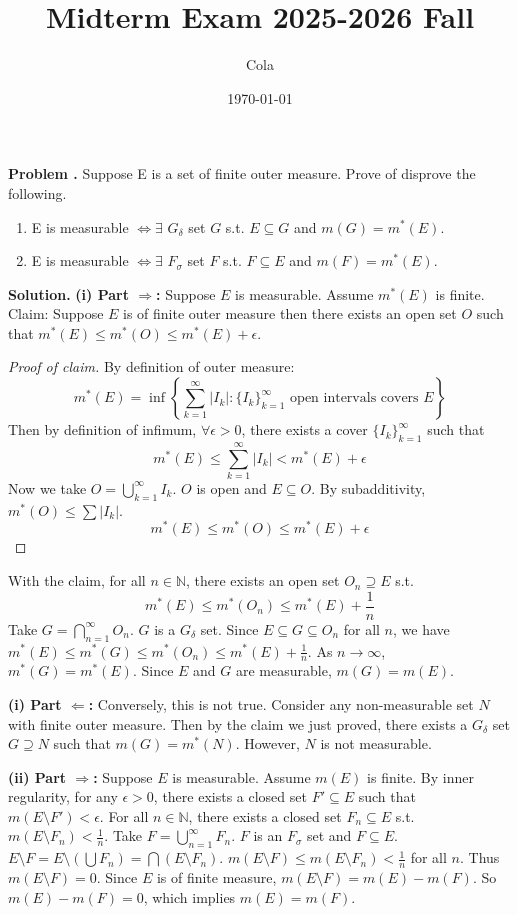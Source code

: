\documentclass[12pt, a4paper, oneside]{article}
\title{\textbf{Midterm Exam 2025-2026 Fall}}
\author{Cola}
\date{\today}
\newcounter{problemname}
\newenvironment{problem}
  {\begin{shaded}\stepcounter{problemname}\par\noindent\textbf{Problem \arabic{problemname}.
}\newline}
  {\end{shaded}\par}
\newenvironment{solution}
  {\par\noindent\textbf{Solution. }\newline}
  {\par}
\begin{document}
\maketitle


\begin{problem}
Suppose E is a set of finite outer measure. Prove of disprove the following.
\begin{enumerate}
    \item E is measurable $\iff \exists$ $G_{\delta}$ set $G$ s.t.
$E \subseteq G$ and $m(G) = m^*(E)$. 
    \item E is measurable $\iff \exists$ $F_{\sigma}$ set $F$ s.t. $F \subseteq E$ and $m(F) = m^*(E)$.
\end{enumerate}
\end{problem}

\begin{solution}
\textbf{(i) Part $\Rightarrow$:}
Suppose $E$ is measurable.
Assume $m^*(E)$ is finite.
Claim: Suppose $E$ is of finite outer measure then there exists an open set $O$ such that $m^*(E) \le m^*(O) \le m^*(E) + \epsilon$.
\begin{proof}[Proof of claim]
By definition of outer measure:
$$ m^*(E) = \inf \left\{ \sum_{k=1}^\infty |I_k| : \{I_k\}_{k=1}^\infty \text{ open intervals covers } E \right\} $$
Then by definition of infimum, $\forall \epsilon > 0$, there exists a cover $\{I_k\}_{k=1}^\infty$ such that
$$ m^*(E) \le \sum_{k=1}^\infty |I_k| < m^*(E) + \epsilon $$
Now we take $O = \bigcup_{k=1}^\infty I_k$. $O$ is open and $E \subseteq O$. By subadditivity, $m^*(O) \le \sum |I_k|$.
$$ m^*(E) \le m^*(O) \le m^*(E) + \epsilon $$
\end{proof}
With the claim, for all $n \in \mathbb{N}$, there exists an open set $O_n \supseteq E$ s.t.
$$ m^*(E) \le m^*(O_n) \le m^*(E) + \frac{1}{n} $$
Take $G = \bigcap_{n=1}^\infty O_n$. $G$ is a $G_\delta$ set.
Since $E \subseteq G \subseteq O_n$ for all $n$, we have $m^*(E) \le m^*(G) \le m^*(O_n) \le m^*(E) + \frac{1}{n}$.
As $n \to \infty$, $m^*(G) = m^*(E)$. Since $E$ and $G$ are measurable, $m(G) = m(E)$.

\noindent \textbf{(i) Part $\Leftarrow$:}
Conversely, this is not true.
Consider any non-measurable set $N$ with finite outer measure.
Then by the claim we just proved, there exists a $G_\delta$ set $G \supseteq N$ such that $m(G) = m^*(N)$.
However, $N$ is not measurable.

\vspace{1em}
\noindent \textbf{(ii) Part $\Rightarrow$:}
Suppose $E$ is measurable.
Assume $m(E)$ is finite. By inner regularity, for any $\epsilon > 0$, there exists a closed set $F' \subseteq E$ such that $m(E \setminus F') < \epsilon$.
For all $n \in \mathbb{N}$, there exists a closed set $F_n \subseteq E$ s.t. $m(E \setminus F_n) < \frac{1}{n}$.
Take $F = \bigcup_{n=1}^\infty F_n$. $F$ is an $F_\sigma$ set and $F \subseteq E$.
$E \setminus F = E \setminus (\bigcup F_n) = \bigcap (E \setminus F_n)$.
$m(E \setminus F) \le m(E \setminus F_n) < \frac{1}{n}$ for all $n$.
Thus $m(E \setminus F) = 0$.
Since $E$ is of finite measure, $m(E \setminus F) = m(E) - m(F)$.
So $m(E) - m(F) = 0$, which implies $m(E) = m(F)$.


\end{solution}
\end{document}
